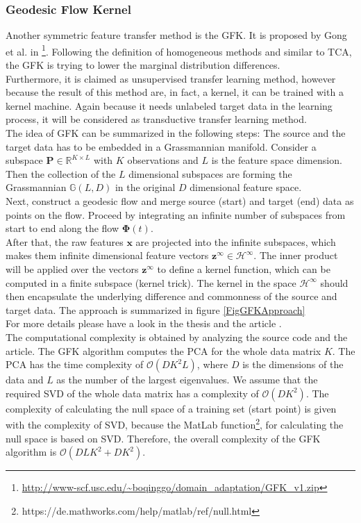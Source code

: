 \subsubsection{Geodesic Flow Kernel}
Another symmetric feature transfer method is the \ac{GFK}. 
It is proposed by Gong et al. in \cite{Gong.}\footnote{\url{http://www-scf.usc.edu/~boqinggo/domain\_adaptation/GFK\_v1.zip}}.
Following the definition of homogeneous methods and similar to \acs{TCA}, the \acl{GFK} is trying to lower the marginal distribution differences.\cite[p. 13]{Weiss.2016}\\
Furthermore, it is claimed as unsupervised transfer learning method, however because the result of this method are, in fact, a kernel, it can be trained with a kernel machine.\cite{Gong.}
Again because it needs unlabeled target data in the learning process, it will be considered as transductive transfer learning method.\\
The idea of \acs{GFK} can be summarized in the following steps:
The source and the target data has to be embedded in a Grassmannian manifold.
Consider a subspace $\mathbf{P} \in \mathbb{R}^{K \times L}$ with $K$ observations and $L$ is the feature space dimension.
Then the collection of the $L$ dimensional subspaces are forming the Grassmannian $\mathbb{G}(L, D)$ in the original $D$ dimensional feature space.\cite{Gong.}\\
Next, construct a geodesic flow and merge source (start) and target (end) data as points on the flow.
Proceed by integrating an infinite number of subspaces from start to end along the flow $\boldsymbol{\Phi}(t)$.\cite{Gong.}\\
After that, the raw features $\mathbf{x}$ are projected into the infinite subspaces, which makes them infinite dimensional feature vectors $\mathbf{z}^\infty \in \mathcal{H}^\infty$.
The inner product will be applied over the vectors $\mathbf{z}^\infty$ to define a kernel function, which can be computed in a finite subspace (kernel trick).
The kernel in the space $\mathcal{H}^\infty$ should then encapsulate the underlying difference and commonness of the source and target data.\cite{Gong.} The approach is summarized in figure \ref{FigGFKApproach}\\
For more details please have a look in the thesis \cite[p. 45;110-113]{Gong.2015} and the article \cite{Gong.}.\\
The computational complexity is obtained by analyzing the source code and the article.
The \acs{GFK} algorithm computes the \ac{PCA} for the whole data matrix $K$. The \acs{PCA} has the time complexity of $\mathcal{O}(DK^2L)$, where $D$ is the dimensions of the data and $L$ as the number of the largest eigenvalues.\cite[p. 563]{Bishop.2009} We assume that the required \acs{SVD} of the whole data matrix has a complexity of $\mathcal{O}(DK^2)$. The complexity of calculating the null space of a training set (start point) is given with the complexity of \acs{SVD}, because the MatLab function\footnote{https://de.mathworks.com/help/matlab/ref/null.html}, for calculating the null space is based on \acs{SVD}. Therefore, the overall complexity of the \acs{GFK} algorithm is $\mathcal{O}(DLK^2+DK^2)$.
